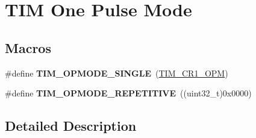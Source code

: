 \hypertarget{group___t_i_m___one___pulse___mode}{\section{T\-I\-M One Pulse Mode}
\label{group___t_i_m___one___pulse___mode}
}
\subsection*{Macros}
\begin{DoxyCompactItemize}
\item 
\hypertarget{group___t_i_m___one___pulse___mode_gab0447b341024e86145c7ce0dc2931fc6}{\#define {\bfseries T\-I\-M\-\_\-\-O\-P\-M\-O\-D\-E\-\_\-\-S\-I\-N\-G\-L\-E}~(\hyperlink{group___peripheral___registers___bits___definition_ga6d3d1488296350af6d36fbbf71905d29}{T\-I\-M\-\_\-\-C\-R1\-\_\-\-O\-P\-M})}\label{group___t_i_m___one___pulse___mode_gab0447b341024e86145c7ce0dc2931fc6}

\item 
\hypertarget{group___t_i_m___one___pulse___mode_ga14a7b6f95769c5b430f65189d9c7cfa3}{\#define {\bfseries T\-I\-M\-\_\-\-O\-P\-M\-O\-D\-E\-\_\-\-R\-E\-P\-E\-T\-I\-T\-I\-V\-E}~((uint32\-\_\-t)0x0000)}\label{group___t_i_m___one___pulse___mode_ga14a7b6f95769c5b430f65189d9c7cfa3}

\end{DoxyCompactItemize}


\subsection{Detailed Description}
